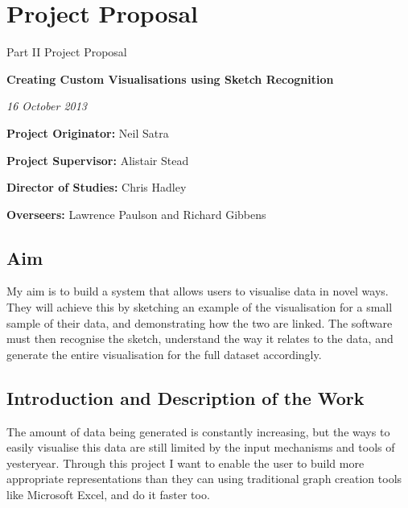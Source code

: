 \chapter{Project Proposal}
\thispagestyle{empty}

\medskip
{}
\medskip
{}

\vfil

\centerline{\large Part II Project Proposal}
\vspace{0.4in}
\centerline{\Large\bf Creating Custom Visualisations using Sketch Recognition}
\vspace{0.3in}
\centerline{\large \emph{16 October 2013}}

\vfil

{\bf Project Originator:} Neil Satra

{\bf Project Supervisor:} Alistair Stead

{\bf Director of Studies:}  Chris Hadley

{\bf Overseers:} Lawrence Paulson and Richard Gibbens

\vfil
\eject






\section*{Aim}

My aim is to build a system that allows users to visualise data in novel ways. They will achieve this by sketching an example of the visualisation for a small sample of their data, and demonstrating how the two are linked. The software must then recognise the sketch, understand the way it relates to the data, and generate the entire visualisation for the full dataset accordingly.







\section*{Introduction and Description of the Work}

The amount of data being generated is constantly increasing, but the ways to easily visualise this data are still limited by the input mechanisms and tools of yesteryear. Through this project I want to enable the user to build more appropriate representations than they can using traditional graph creation tools like Microsoft Excel, and do it faster too.

